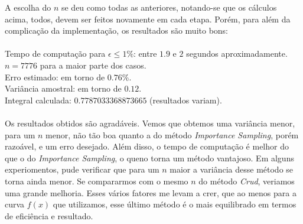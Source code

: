 \documentclass[pt12]{article}
\begin{document}
A escolha do $n$ se deu como todas as anteriores, notando-se que os cálculos acima, todos, devem ser feitos novamente em cada etapa. Porém, para além da complicação da implementação, os resultados são muito bons:\\
\ \\

\noindent Tempo de computação para $\epsilon \leq 1\%$: entre $1.9$ e $2$ segundos aproximadamente. \\
$n = 7776$ para a maior parte dos casos. \\
Erro estimado: em torno de $0.76\%$.\\
Variância amostral: em torno de $0.12$.\\
Integral calculada: $0.7787033368873665$ (resultados variam).\\
\ \\

Os resultados obtidos são agradáveis. Vemos que obtemos uma variância menor, para um $n$ menor, não tão boa quanto a do método \textit{Importance Sampling}, porém razoável, e um erro desejado. Além disso, o tempo de computação é melhor do que o do \textit{Importance Sampling}, o queno torna um método vantajoso. Em alguns experiomentos, pude verificar que para um $n$ maior a variância desse método se torna ainda menor. Se compararmos com o mesmo $n$ do método \textit{Crud}, veriamos uma grande melhoria. Esses vários fatores me levam a crer, que ao menos para a curva $f(x)$ que utilizamos, esse último método é o mais equilibrado em termos de eficiência e resultado.
\end{document}
